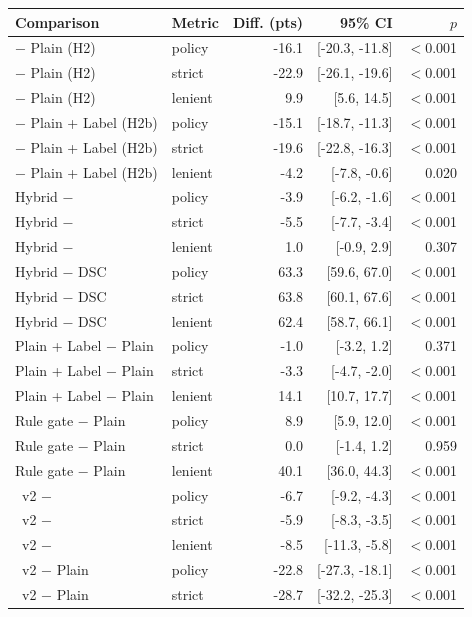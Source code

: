 \begin{tabular}{llrrr}\toprule
Comparison & Metric & Diff. (pts) & 95\% CI & $p$ \\ \midrule
\recheck{} $-$ Plain (H2) & policy & -16.1 & [-20.3, -11.8] & $<$0.001 \\
\recheck{} $-$ Plain (H2) & strict & -22.9 & [-26.1, -19.6] & $<$0.001 \\
\recheck{} $-$ Plain (H2) & lenient & 9.9 & [5.6, 14.5] & $<$0.001 \\
\recheck{} $-$ Plain + Label (H2b) & policy & -15.1 & [-18.7, -11.3] & $<$0.001 \\
\recheck{} $-$ Plain + Label (H2b) & strict & -19.6 & [-22.8, -16.3] & $<$0.001 \\
\recheck{} $-$ Plain + Label (H2b) & lenient & -4.2 & [-7.8, -0.6] & 0.020 \\
Hybrid $-$ \recheck{} & policy & -3.9 & [-6.2, -1.6] & $<$0.001 \\
Hybrid $-$ \recheck{} & strict & -5.5 & [-7.7, -3.4] & $<$0.001 \\
Hybrid $-$ \recheck{} & lenient & 1.0 & [-0.9, 2.9] & 0.307 \\
Hybrid $-$ DSC & policy & 63.3 & [59.6, 67.0] & $<$0.001 \\
Hybrid $-$ DSC & strict & 63.8 & [60.1, 67.6] & $<$0.001 \\
Hybrid $-$ DSC & lenient & 62.4 & [58.7, 66.1] & $<$0.001 \\
Plain + Label $-$ Plain & policy & -1.0 & [-3.2, 1.2] & 0.371 \\
Plain + Label $-$ Plain & strict & -3.3 & [-4.7, -2.0] & $<$0.001 \\
Plain + Label $-$ Plain & lenient & 14.1 & [10.7, 17.7] & $<$0.001 \\
Rule gate $-$ Plain & policy & 8.9 & [5.9, 12.0] & $<$0.001 \\
Rule gate $-$ Plain & strict & 0.0 & [-1.4, 1.2] & 0.959 \\
Rule gate $-$ Plain & lenient & 40.1 & [36.0, 44.3] & $<$0.001 \\
\recheck{}~v2 $-$ \recheck{} & policy & -6.7 & [-9.2, -4.3] & $<$0.001 \\
\recheck{}~v2 $-$ \recheck{} & strict & -5.9 & [-8.3, -3.5] & $<$0.001 \\
\recheck{}~v2 $-$ \recheck{} & lenient & -8.5 & [-11.3, -5.8] & $<$0.001 \\
\recheck{}~v2 $-$ Plain & policy & -22.8 & [-27.3, -18.1] & $<$0.001 \\
\recheck{}~v2 $-$ Plain & strict & -28.7 & [-32.2, -25.3] & $<$0.001 \\

\end{tabular}
